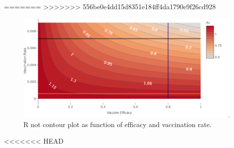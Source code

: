 =======
>>>>>>> 556be0e4dd15d8351e184ff4da1790e9f26cd928
\begin{figure}[tbh]
    \centering
      \includegraphics[scale=0.5, keepaspectratio]{Figures/Rv_contour}
    \caption{R not contour plot as function of efficacy and vaccination rate.}
    \label{fig:rvcontour1}
\end{figure}
<<<<<<< HEAD

